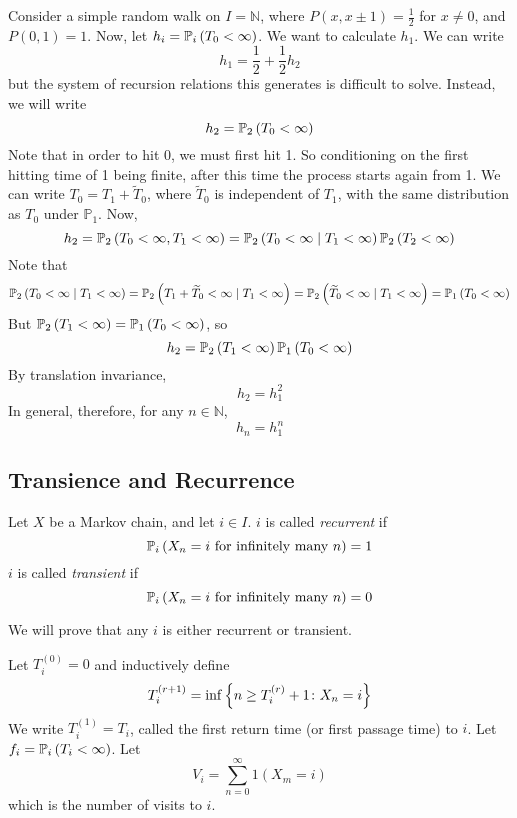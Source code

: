 \begin{example}
	Consider a simple random walk on \( I = \mathbb N \), where \( P(x,x\pm 1) = \frac{1}{2} \) for \( x \neq 0 \), and \( P(0,1) = 1 \).
	Now, let \( h_i = \mathbb{P}_{i}\left({T_0 < \infty}\right) \).
	We want to calculate \( h_1 \).
	We can write
	\[
		h_1 = \frac{1}{2} + \frac{1}{2} h_2
	\]
	but the system of recursion relations this generates is difficult to solve.
	Instead, we will write
	\[
		h_2 = \mathbb{P}_{2}\left({T_0 < \infty}\right)
	\]
	Note that in order to hit 0, we must first hit 1.
	So conditioning on the first hitting time of 1 being finite, after this time the process starts again from 1.
	We can write \( T_0 = T_1 + \widetilde T_0 \), where \( \widetilde T_0 \) is independent of \( T_1 \), with the same distribution as \( T_0 \) under \( \mathbb P_1 \).
	Now,
	\[
		h_2 = \mathbb{P}_{2}\left({T_0 < \infty, T_1 < \infty}\right) = \mathbb{P}_{2}\left({T_0 < \infty \mid T_1 < \infty}\right) \mathbb{P}_{2}\left({T_2 < \infty}\right)
	\]
	Note that
	\[
		\mathbb{P}_{2}\left({T_0 < \infty \mid T_1 < \infty}\right) = \mathbb{P}_{2}\left({T_1 + \widetilde T_0 < \infty \mid T_1 < \infty}\right) = \mathbb{P}_{2}\left({\widetilde T_0 < \infty \mid T_1 < \infty}\right) = \mathbb{P}_{1}\left({T_0 < \infty}\right)
	\]
	But \( \mathbb{P}_{2}\left({T_1 < \infty}\right) = \mathbb{P}_{1}\left({T_0 < \infty}\right) \), so
	\[
		h_2 = \mathbb{P}_{2}\left({T_1 < \infty}\right) \mathbb{P}_{1}\left({T_0 < \infty}\right)
	\]
	By translation invariance,
	\[
		h_2 = h_1^2
	\]
	In general, therefore, for any \( n \in \mathbb N \),
	\[
		h_n = h_1^n
	\]
\end{example}

\subsection{Transience and Recurrence}
\begin{definition}
	Let \( X \) be a Markov chain, and let \( i \in I \).
	\( i \) is called \textit{recurrent} if
	\[
		\mathbb{P}_{i}\left({X_n = i \text{ for infinitely many } n}\right) = 1
	\]
	\( i \) is called \textit{transient} if
	\[
		\mathbb{P}_{i}\left({X_n = i \text{ for infinitely many } n}\right) = 0
	\]
\end{definition}
\noindent We will prove that any \( i \) is either recurrent or transient.
\begin{definition}
	Let \( T_i^{(0)} = 0 \) and inductively define
	\[
		T_i^{(r+1)} = \inf \qty{n \geq T_i^{(r)} + 1 \colon X_n = i}
	\]
	We write \( T_i^{(1)} = T_i \), called the first return time (or first passage time) to \( i \).
	Let \( f_i = \mathbb{P}_{i}\left({T_i < \infty}\right) \).
	Let
	\[
		V_i = \sum_{n=0}^\infty 1(X_m = i)
	\]
	which is the number of visits to \( i \).
\end{definition}
